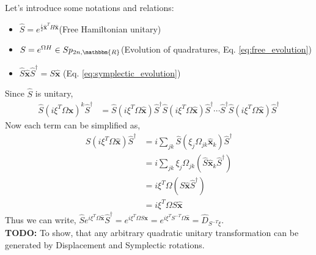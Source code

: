 \documentclass[english,10pt,a4paper]{article}
\newcommand{\xx}{\hat{\textbf{x}}}
\newcommand{\dd}[1]{\hat{D}_{#1}}
\begin{document}
	Let's introduce some notations and relations:
	\begin{itemize}
		\item  $\hat S = e^{\frac{i}{2} \xx^T H \xx}$\hfill (Free Hamiltonian unitary)
		\item  $S = e^{\Omega H} \in Sp_{2n,\mathbbm{R}}$\hfill(Evolution of quadratures, Eq. \ref{eq:free_evolution})
		\item $\hat S \xx \hat S^\dagger = S \xx$ \hfill (Eq. \ref{eq:symplectic_evolution})
	\end{itemize}
			Since $\hat S$ is unitary,
	\begin{align}
		\hat S (i\xi^T \Omega \xx)^k \hat S^\dagger &= \hat S (i\xi^T \Omega \xx) \hat S^\dagger \hat S (i\xi^T \Omega \xx) \hat S^\dagger \cdots \hat S ^ \dagger\hat S (i\xi^T \Omega \xx) \hat S^\dagger
	\end{align}
	Now each term can be simplified as,
	\begin{align}
		\hat S (i\xi^T \Omega \xx)\hat S ^\dagger &= i \sum_{jk} \hat{S}(\xi_j \Omega_{jk}\xx_k)\hat S ^\dagger \\
		&= i\sum_{jk}\xi_j \Omega_{jk}(\hat{S}\xx_k \hat{S}^\dagger)\\
		&= i \xi^T\Omega(\hat S \xx \hat S^\dagger)\\
		&= i \xi^T\Omega  S \xx
	\end{align}
	Thus we can write, $ \hat S e^{i\xi^T \Omega \xx} \hat S ^\dagger = e^{i\xi^T \Omega S \xx} = e^{i\xi^T S^{-T} \Omega \xx} = \dd{S^{-T}\xi}$.\\
	
	\textbf{TODO: }To show, that any arbitrary quadratic unitary transformation can be generated by Displacement and Symplectic rotations.
	
\end{document}

